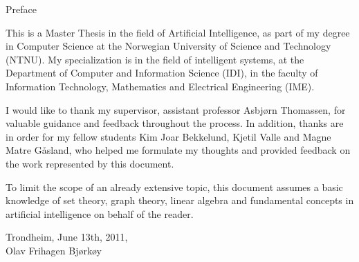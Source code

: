 \null\vspace{7em}
{
  \centering
  \normalfont
  \huge
  Preface\\
}
\vspace{2em}

\noindent
This is a Master Thesis in the field of Artificial Intelligence,
as part of my degree in Computer Science
at the Norwegian University of Science and Technology (NTNU).
My specialization is in the field of intelligent systems, 
at the Department of Computer and Information Science (IDI), 
in the faculty of Information Technology, Mathematics and Electrical Engineering (IME).

I would like to thank my supervisor, assistant professor Asbjørn Thomassen, for valuable guidance and feedback throughout the process.
In addition, thanks are in order for my fellow students 
Kim Joar Bekkelund, Kjetil Valle and Magne Matre Gåsland,
who helped me formulate my thoughts and provided feedback on the work represented by this document.

To limit the scope of an already extensive topic, 
this document assumes a basic knowledge of set theory, 
graph theory, linear algebra and fundamental concepts in artificial intelligence 
on behalf of the reader.

\vspace{1em}
\begin{flushleft}
  Trondheim, June 13th, 2011,\\
  Olav Frihagen Bjørkøy\\
\end{flushleft}

\cleardoublepage
